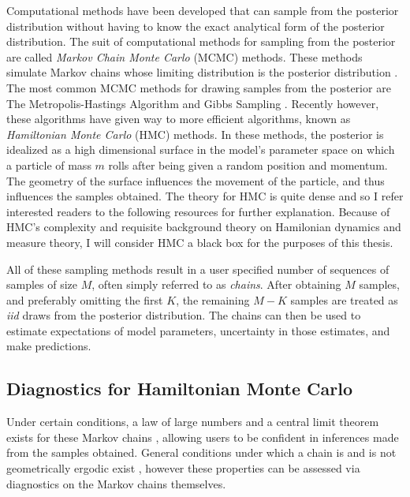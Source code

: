 Computational methods have been developed that can sample from the posterior distribution without having to know the exact analytical form of the posterior distribution. The suit of computational methods for sampling from the posterior are called \textit{Markov Chain Monte Carlo} (MCMC) methods.  These methods simulate Markov chains whose limiting distribution is the posterior distribution \cite{livingstone2016geometric}.  The most common MCMC methods for drawing  samples from the posterior are The Metropolis-Hastings Algorithm and Gibbs Sampling \cite{gelman2013bayesian,mcelreath2016statistical}.  Recently however, these algorithms have given way to more efficient algorithms, known as \textit{Hamiltonian Monte Carlo} (HMC) methods.  In these methods, the posterior is idealized as a high dimensional surface in the model's parameter space on which a particle of mass $ m $ rolls after being given a random position and momentum.  The geometry of the surface influences the movement of the particle, and thus influences the samples obtained.   The theory for HMC is quite dense and so  I refer interested readers to the following resources \cite{ gelman2013bayesian, livingstone2016geometric, mcelreath2016statistical,neal2011mcmc, hoffman2014no,betancourt2017conceptual} for further explanation.  Because of HMC's complexity and requisite background theory on Hamilonian dynamics and measure theory, I will consider HMC a black box for the purposes of this thesis.

All of these sampling methods result in a user specified number of sequences of samples of size $ M$, often simply referred to as \textit{chains}. After obtaining $ M $ samples, and preferably omitting the first $ K $, the remaining $ M-K $ samples are treated as \textit{iid} draws from the posterior distribution.  The chains can then be used to estimate expectations of model parameters, uncertainty in those estimates, and make predictions.

\subsection{Diagnostics for Hamiltonian Monte Carlo}

Under certain conditions, a law of large numbers and a central limit theorem exists for these Markov chains \cite{livingstone2016geometric, betancourt2017robust}, allowing users to be confident in inferences made from the samples obtained.  General conditions under which a chain is and is not geometrically ergodic exist \cite{livingstone2016geometric}, however these properties can be assessed via diagnostics on the Markov chains themselves.

